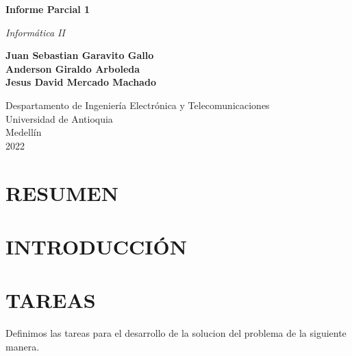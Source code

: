 \documentclass{article}
\begin{document}
\begin{titlepage}
    \begin{center}
        \vspace*{1cm}
        
        \Huge
        \textbf{Informe Parcial 1}
            
        \vspace{0.5cm}
        \LARGE
       \textit{ Informática II}
            
        \vspace{1.5cm}
            
        \textbf{Juan Sebastian Garavito Gallo\\
        Anderson Giraldo Arboleda\\
        Jesus David Mercado Machado}
            
        \vfill
            
        \vspace{0.8cm}
            
        \Large
        Despartamento de Ingeniería Electrónica y Telecomunicaciones\\
        Universidad de Antioquia\\
        Medellín\\
        2022
            
    \end{center}
\end{titlepage}

\tableofcontents
\newpage

\section{RESUMEN}
\label{resumen}




\newpage
\section{INTRODUCCIÓN}

\newpage
\section{TAREAS}
\label{tareas}
Definimos las tareas para el desarrollo de la solucion del problema de la siguiente manera.
\end{document}
